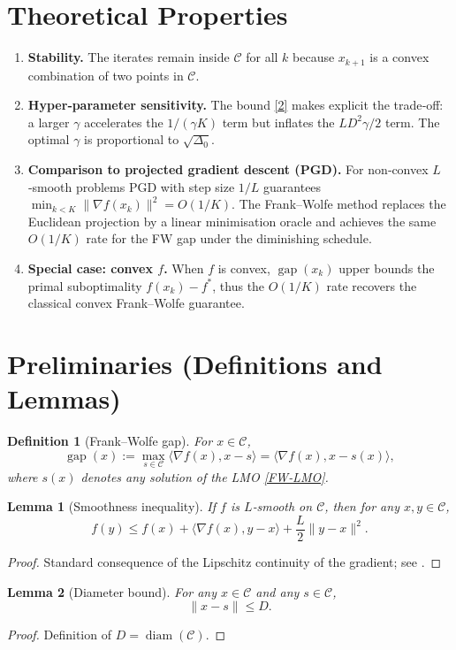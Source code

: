 \documentclass{article}
\newtheorem{lemma}{Lemma}
\newtheorem{definition}{Definition}
\newcommand{\diam}{\operatorname{diam}}
\newcommand{\gap}{\operatorname{gap}}
\begin{document}
\section{Theoretical Properties}
\label{sec:properties}
\begin{enumerate}[label=\arabic*.]
\item \textbf{Stability.}  The iterates remain inside $\mathcal C$ for all $k$ because $x_{k+1}$ is a convex combination of two points in $\mathcal C$.
\item \textbf{Hyper‑parameter sensitivity.}  The bound \eqref{2} makes explicit the trade‑off: a larger $\gamma$ accelerates the $1/(\gamma K)$ term but inflates the $L D^{2}\gamma/2$ term.  The optimal $\gamma$ is proportional to $\sqrt{\Delta_{0}}$.
\item \textbf{Comparison to projected gradient descent (PGD).}  For non‑convex $L$‑smooth problems PGD with step size $1/L$ guarantees $\min_{k<K}\|\nabla f(x_{k})\|^{2}=O(1/K)$.  The Frank–Wolfe method replaces the Euclidean projection by a linear minimisation oracle and achieves the same $O(1/K)$ rate for the FW gap under the diminishing schedule.
\item \textbf{Special case: convex $f$.}  When $f$ is convex, $\gap(x_{k})$ upper bounds the primal suboptimality $f(x_{k})-f^{*}$, thus the $O(1/K)$ rate recovers the classical convex Frank–Wolfe guarantee.
\end{enumerate}
\section{Preliminaries (Definitions and Lemmas)}
\label{sec:prelim}
\begin{definition}[Frank–Wolfe gap]
For $x\in\mathcal C$, 
\[
\gap(x):=\max_{s\in\mathcal C}\langle \nabla f(x),x-s\rangle
       =\langle \nabla f(x),x-s(x)\rangle,
\]
where $s(x)$ denotes any solution of the LMO \eqref{FW‑LMO}.
\end{definition}
\begin{lemma}[Smoothness inequality]
\label{lem:smooth}
If $f$ is $L$‑smooth on $\mathcal C$, then for any $x,y\in\mathcal C$,
\[
f(y)\le f(x)+\langle \nabla f(x),y-x\rangle+\frac{L}{2}\|y-x\|^{2}.
\tag{S}
\]
\end{lemma}
\begin{proof}
Standard consequence of the Lipschitz continuity of the gradient; see \cite{Nesterov2004}.
\end{proof}
\begin{lemma}[Diameter bound]
\label{lem:diam}
For any $x\in\mathcal C$ and any $s\in\mathcal C$,
\[
\|x-s\|\le D.
\tag{D}
\]
\end{lemma}
\begin{proof}
Definition of $D=\diam(\mathcal C)$.
\end{proof}
\end{document}
